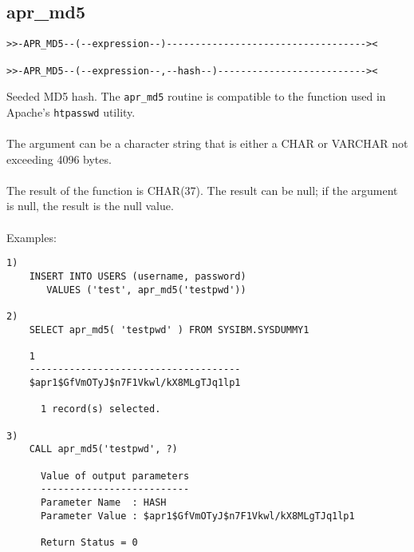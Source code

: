 \subsection{apr\_md5} \label{aprmd5}
\begin{verbatim}
>>-APR_MD5--(--expression--)-----------------------------------><

>>-APR_MD5--(--expression--,--hash--)--------------------------><
\end{verbatim}
Seeded MD5 hash. The {\tt apr\_md5} routine is compatible to the function used in Apache's {\tt htpasswd} utility.\\
\\
The argument can be a character string that is either a \mbox{CHAR} or \mbox{VARCHAR} not exceeding 4096 bytes.\\
\\
The result of the function is CHAR(37). The result can be null; if the argument is null, the result is the null value.\\
\\
Examples:
\begin{verbatim}
1)
    INSERT INTO USERS (username, password)
       VALUES ('test', apr_md5('testpwd'))

2)
    SELECT apr_md5( 'testpwd' ) FROM SYSIBM.SYSDUMMY1

    1
    -------------------------------------
    $apr1$GfVmOTyJ$n7F1Vkwl/kX8MLgTJq1lp1

      1 record(s) selected.

3)
    CALL apr_md5('testpwd', ?)

      Value of output parameters
      --------------------------
      Parameter Name  : HASH
      Parameter Value : $apr1$GfVmOTyJ$n7F1Vkwl/kX8MLgTJq1lp1

      Return Status = 0
\end{verbatim}
\newpage
\hypertarget{haprcrypt}{}
